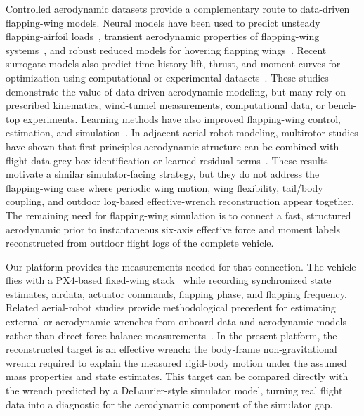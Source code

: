 Controlled aerodynamic datasets provide a complementary route to data-driven flapping-wing models. Neural models have been used to predict unsteady flapping-airfoil loads~\cite{kurtulus_ability_2009}, transient aerodynamic properties of flapping-wing systems~\cite{lan_neural_2022}, and robust reduced models for hovering flapping wings~\cite{calado_robust_2023}. Recent surrogate models also predict time-history lift, thrust, and moment curves for optimization using computational or experimental datasets~\cite{wang_time-history_2024,corban_discovering_2023,chen_data-driven_2026}. These studies demonstrate the value of data-driven aerodynamic modeling, but many rely on prescribed kinematics, wind-tunnel measurements, computational data, or bench-top experiments. Learning methods have also improved flapping-wing control, estimation, and simulation~\cite{he_adaptive_2017,qian_neural_2023,qian_learning_2023,fei_flappy_2019}. In adjacent aerial-robot modeling, multirotor studies have shown that first-principles aerodynamic structure can be combined with flight-data grey-box identification or learned residual terms~\cite{sun2019quadrotor_graybox,bauersfeld2021neurobem}. These results motivate a similar simulator-facing strategy, but they do not address the flapping-wing case where periodic wing motion, wing flexibility, tail/body coupling, and outdoor log-based effective-wrench reconstruction appear together. The remaining need for flapping-wing simulation is to connect a fast, structured aerodynamic prior to instantaneous six-axis effective force and moment labels reconstructed from outdoor flight logs of the complete vehicle.

Our platform provides the measurements needed for that connection. The vehicle flies with a PX4-based fixed-wing stack~\cite{meier2015px4} while recording synchronized state estimates, airdata, actuator commands, flapping phase, and flapping frequency. Related aerial-robot studies provide methodological precedent for estimating external or aerodynamic wrenches from onboard data and aerodynamic models rather than direct force-balance measurements~\cite{tomic2016flying_anemometer,tomic2020scafe}. In the present platform, the reconstructed target is an effective wrench: the body-frame non-gravitational wrench required to explain the measured rigid-body motion under the assumed mass properties and state estimates. This target can be compared directly with the wrench predicted by a DeLaurier-style simulator model, turning real flight data into a diagnostic for the aerodynamic component of the simulator gap.

